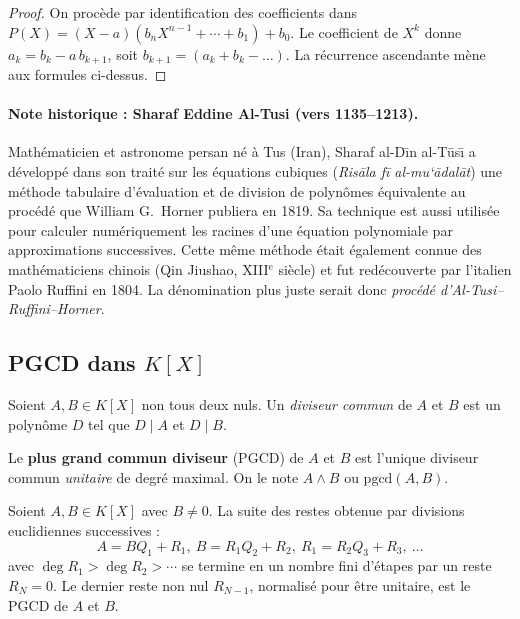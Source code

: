 \begin{proof}
On procède par identification des coefficients dans $P(X) = (X - a)(b_n X^{n-1} + \cdots + b_1) + b_0$. Le coefficient de $X^k$ donne $a_k = b_k - a\, b_{k+1}$, soit $b_{k+1} = (a_k + b_k - \dots)$. La récurrence ascendante mène aux formules ci-dessus.
\end{proof}

\paragraph{Note historique : Sharaf Eddine Al-Tusi (vers 1135--1213).}
Mathématicien et astronome persan né à Tus (Iran), Sharaf al-D\={\i}n al-T\={u}s\={\i} a développé dans son traité sur les équations cubiques (\emph{Risāla fī al-mu‘ādalāt}) une méthode tabulaire d'évaluation et de division de polynômes équivalente au procédé que William G.\ Horner publiera en 1819. Sa technique est aussi utilisée pour calculer numériquement les racines d'une équation polynomiale par approximations successives. Cette même méthode était également connue des mathématiciens chinois (Qin Jiushao, XIII$^{\text{e}}$ siècle) et fut redécouverte par l'italien Paolo Ruffini en 1804. La dénomination plus juste serait donc \emph{procédé d'Al-Tusi--Ruffini--Horner}.

\subsection{PGCD dans $K[X]$}

\begin{definition}
Soient $A, B \in K[X]$ non tous deux nuls. Un \emph{diviseur commun} de $A$ et $B$ est un polynôme $D$ tel que $D \mid A$ et $D \mid B$.

Le \textbf{plus grand commun diviseur} (PGCD) de $A$ et $B$ est l'unique diviseur commun \emph{unitaire} de degré maximal. On le note $A \wedge B$ ou $\mathrm{pgcd}(A, B)$.
\end{definition}

\begin{theoreme}
Soient $A, B \in K[X]$ avec $B \neq 0$. La suite des restes obtenue par divisions euclidiennes successives :
\[ A = B Q_1 + R_1,\ B = R_1 Q_2 + R_2,\ R_1 = R_2 Q_3 + R_3,\ \dots \]
avec $\deg R_1 > \deg R_2 > \cdots$ se termine en un nombre fini d'étapes par un reste $R_N = 0$. Le dernier reste non nul $R_{N-1}$, normalisé pour être unitaire, est le PGCD de $A$ et $B$.
\end{theoreme}

